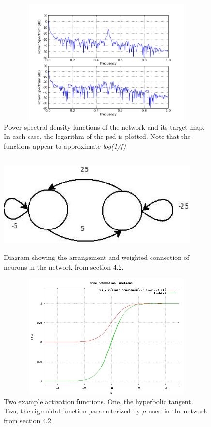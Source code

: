 \documentclass[12pt]{article}
\begin{document}
\begin{figure}[htb]
\begin{center}
\includegraphics[height=2.5in,width=4.5in]{images/psd_1.png}
\caption{Power spectral density functions of the network and its target map.  In each case, the logarithm of the psd is plotted.  Note that the functions appear to approximate \textit{log(1/f)}}
\end{center}
\end{figure}
\clearpage
\begin{figure}[htb]
\begin{center}
\includegraphics[height=2in,width=4in]{images/the_network_in_question_simple.jpeg}
\caption{Diagram showing the arrangement and weighted connection of neurons in the network from section 4.2.}
\end{center}
\end{figure}
\begin{figure}[htb]
\begin{center}
\includegraphics[height=2.5in,width=4.5in]{images/activation_funcs.jpg}
\caption{Two example activation functions.  One, the hyperbolic tangent.  Two, the sigmoidal function parameterized by $\mu$ used in the network from section 4.2}
\end{center}
\end{figure}
\end{document}
